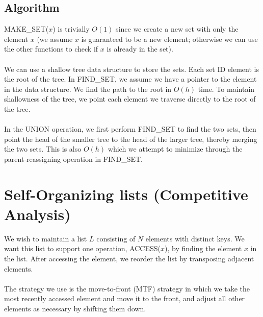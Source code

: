 \documentclass{article}
\begin{document}
\subsection*{Algorithm}
MAKE\_SET($x$) is trivially $O(1)$ since we create a new set with only the element $x$ (we assume $x$ is guaranteed to be a new element; otherwise we can use the other functions to check if $x$ is already in the set).\\
\\
We can use a shallow tree data structure to store the sets. Each set ID element is the root of the tree. In FIND\_SET, we assume we have a pointer to the element in the data structure. We find the path to the root in $O(h)$ time. To maintain shallowness of the tree, we point each element we traverse directly to the root of the tree.\\
\\
In the UNION operation, we first perform FIND\_SET to find the two sets, then point the head of the smaller tree to the head of the larger tree, thereby merging the two sets. This is also $O(h)$ which we attempt to minimize through the parent-reassigning operation in FIND\_SET.
\\
\section{Self-Organizing lists (Competitive Analysis)}
We wish to maintain a list $L$ consisting of $N$ elements with distinct keys. We want this list to support one operation, ACCESS($x$), by finding the element $x$ in the list. After accessing the element, we reorder the list by transposing adjacent elements.\\
\\
The strategy we use is the move-to-front (MTF) strategy in which we take the most recently accessed element and move it to the front, and adjust all other elements as necessary by shifting them down.
\end{document}
